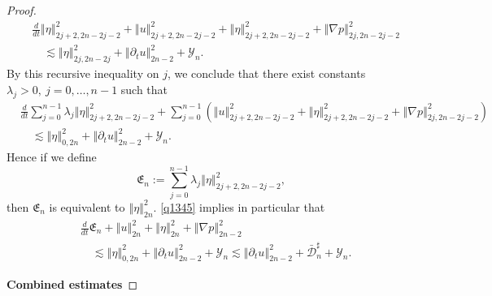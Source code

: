 \documentclass[a4paper,reqno,11pt]{amsart}
\numberwithin{equation}{section}
\providecommand{\norm}[1]{\left\Vert#1\right\Vert}
\providecommand{\norm}[1]{\left\Vert#1\right\Vert}
\begin{document}
\begin{proof}
\begin{equation}
\begin{split}
& \frac{d}{dt}\norm{     \eta  }_{2j+2,2n-2j-2}^2+\norm{      u  }_{2j+2,2n-2j-2}^2+\norm{        \eta  }_{2j+2,2n-2j-2}^2+\norm{\nabla p}_{2j,2n-2j-2}^2
\\&\quad{\lesssim} \norm{ \eta}_{2j,2n-2j}^2+\norm{{\partial}_t u}_{2n-2}^2    +{\mathcal{Y}}_n.
\end{split}
\end{equation}
By this recursive inequality on $j$, we conclude that there exist constants $\lambda_j>0,\ j=0,\dots, n-1$ such that
\begin{equation}\label{q1345}
\begin{split}
& \frac{d}{dt}\sum_{j=0}^{n-1}\lambda_j\norm{     \eta  }_{2j+2,2n-2j-2}^2+\sum_{j=0}^{n-1}\left(\norm{      u  }_{2j+2,2n-2j-2}^2+\norm{        \eta  }_{2j+2,2n-2j-2}^2+\norm{\nabla p}_{2j,2n-2j-2}^2\right)
\\&\quad{\lesssim} \norm{ \eta}_{0,2n}^2+\norm{{\partial}_t u}_{2n-2}^2    +{\mathcal{Y}}_n.
\end{split}
\end{equation}
Hence if we define
\begin{equation}
\mathfrak{E}_n:=\sum_{j=0}^{n-1}\lambda_j\norm{     \eta  }_{2j+2,2n-2j-2}^2,
\end{equation}
then $\mathfrak{E}_n$ is equivalent to $\norm{\eta}_{2n}^2$. \eqref{q1345} implies in particular that
\begin{equation} \label{eses22}
\begin{split}
& \frac{d}{dt}\mathfrak{E}_n
+ \norm{    u  }_{2n}^2+\norm{    \eta  }_{2n}^2+\norm{\nabla p}_{2n-2}^2
\\&\quad {\lesssim} \norm{ \eta}_{0,2n}^2+\norm{{\partial}_t u}_{2n-2}^2    +{\mathcal{Y}}_n{\lesssim}  \norm{{\partial}_t u}_{2n-2}^2+\bar{\mathcal{D}}_n^\sharp   +{\mathcal{Y}}_n.
\end{split}
\end{equation}

{\bf Combined estimates}


\end{proof}
\end{document}

